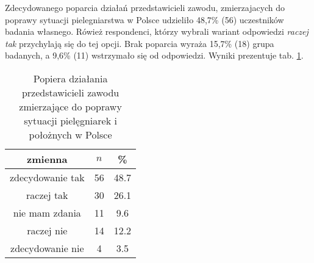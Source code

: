 

Zdecydowanego poparcia działań przedstawicieli zawodu, zmierzajacych do poprawy sytuacji pielegniarstwa w Polsce udzieliło 48,7\% (56) uczestników badania własnego. Rówież respondenci, którzy wybrali wariant odpowiedzi  \textit{raczej tak} przychylają się do tej opcji. Brak poparcia wyraża 15,7\% (18) grupa badanych, a 9,6\% (11) wstrzymało się od odpowiedzi. Wyniki prezentuje tab. \ref{tab:Q19}.



\begin{table}[H]
\caption{Popiera działania przedstawicieli zawodu zmierzające do poprawy sytuacji pielęgniarek i położnych w Polsce}
\centering
\begin{tabular}{ | c | c | c |}
\hline
zmienna & $n$ & \% \\
\hline
zdecydowanie tak  &  56  & 48.7 \\
\hline
raczej tak  &  30  & 26.1\\
\hline
nie mam zdania  &  11  & 9.6 \\
\hline
raczej nie  &  14  & 12.2 \\
\hline
zdecydowanie nie  &  4  & 3.5\\
\hline
\end{tabular}
\label{tab:Q19}
\end{table}


